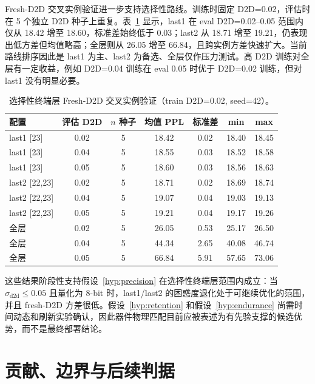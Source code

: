 Fresh-D2D 交叉实例验证进一步支持选择性路线。训练时固定 D2D=0.02，评估时在 5 个独立 D2D 种子上重复。表~\ref{tab:work2_fresh_d2d} 显示，last1 在 eval D2D=0.02--0.05 范围内仅从 18.42 增至 18.60，标准差始终低于 0.03；last2 从 18.71 增至 19.21，仍表现出低方差但均值略高；全层则从 26.05 增至 66.84，且跨实例方差快速扩大。当前路线排序因此是 last1 为主、last2 为备选、全层仅作压力测试。高 D2D 训练对全层有一定收益，例如 D2D=0.04 训练在 eval 0.05 时优于 D2D=0.02 训练，但对 last1 没有明显必要。

\begin{table}[!htbp]
\centering
\caption{选择性终端层 Fresh-D2D 交叉实例验证（train D2D=0.02, seed=42）。}
\label{tab:work2_fresh_d2d}
\begin{tabular}{@{}lcccccc@{}}
\toprule
配置 & 评估 D2D & $n$ 种子 & 均值 PPL & 标准差 & min & max \\
\midrule
last1 [23] & 0.02 & 5 & 18.42 & 0.02 & 18.40 & 18.45 \\
last1 [23] & 0.04 & 5 & 18.55 & 0.03 & 18.52 & 18.58 \\
last1 [23] & 0.05 & 5 & 18.60 & 0.03 & 18.56 & 18.63 \\
\midrule
last2 [22,23] & 0.02 & 5 & 18.71 & 0.02 & 18.69 & 18.74 \\
last2 [22,23] & 0.04 & 5 & 19.07 & 0.04 & 19.03 & 19.13 \\
last2 [22,23] & 0.05 & 5 & 19.21 & 0.04 & 19.17 & 19.26 \\
\midrule
全层 & 0.02 & 5 & 26.05 & 0.53 & 25.17 & 26.50 \\
全层 & 0.04 & 5 & 44.34 & 2.65 & 40.08 & 46.74 \\
全层 & 0.05 & 5 & 66.84 & 5.91 & 57.65 & 73.06 \\
\bottomrule
\end{tabular}
\end{table}

这些结果阶段性支持假设~\ref{hyp:precision} 在选择性终端层范围内成立：当 $\sigma_{\text{d2d}}\le0.05$ 且量化为 8-bit 时，last1/last2 的困惑度退化处于可继续优化的范围，并且 fresh-D2D 方差很低。假设~\ref{hyp:retention} 和假设~\ref{hyp:endurance} 尚需时间动态和刷新实验确认，因此器件物理匹配目前应被表述为有先验支撑的候选优势，而不是最终部署结论。

\FloatBarrier

\section{贡献、边界与后续判据}
\label{sec:work2_contributions}
\label{sec:work2_boundaries}

